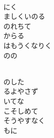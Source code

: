 \documentclass[10pt,b5j]{tarticle} %
\begin{document}
\begin{enumerate}
\begin{minipage}[c]{\blocksize}
    \end{minipage}
    \begin{minipage}[c]{\blocksize}
        
        \vspace{\linespace}
        \item~\\
        にく\\
        ましくいのる\\
        のれちて\\
        からる\\
        はもうくなりく\\
        のの
        
    \end{minipage}
    \begin{minipage}[c]{\blocksize}
        
        \vspace{\linespace}
        \item~\\
        のした\\
        るよやさず\\
        いてな\\
        こそしめて\\
        そうやすなく\\
        もに
    
    \end{minipage}
\end{enumerate} %
\end{document}
